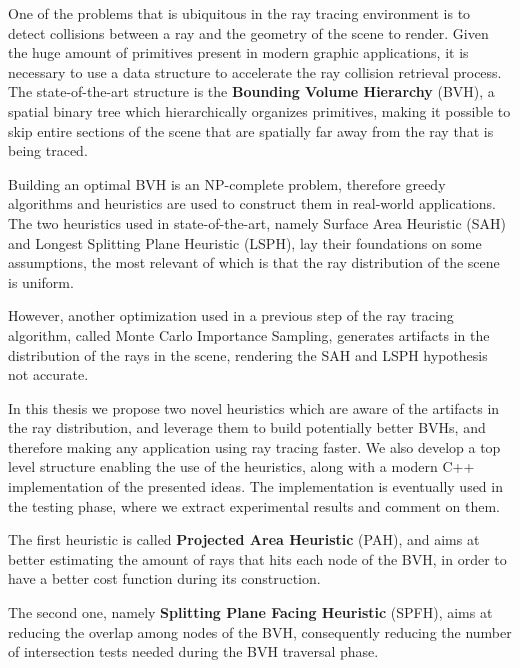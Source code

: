 \documentclass{PoliMi_MasterThesis}
\begin{document}
One of the problems that is ubiquitous in the ray tracing environment is to detect collisions between a ray and the geometry of the scene to render. Given the huge amount of primitives present in modern graphic applications, it is necessary to use a data structure to accelerate the ray collision retrieval process. The state-of-the-art structure is the \textbf{Bounding Volume Hierarchy} (BVH), a spatial binary tree which hierarchically organizes primitives, making it possible to skip entire sections of the scene that are spatially far away from the ray that is being traced. 

Building an optimal BVH is an NP-complete problem, therefore greedy algorithms and heuristics are used to construct them in real-world applications. The two heuristics used in state-of-the-art, namely Surface Area Heuristic (SAH) and Longest Splitting Plane Heuristic (LSPH), lay their foundations on some assumptions, the most relevant of which is that the ray distribution of the scene is uniform.

However, another optimization used in a previous step of the ray tracing algorithm, called Monte Carlo Importance Sampling, generates artifacts in the distribution of the rays in the scene, rendering the SAH and LSPH hypothesis not accurate.

In this thesis we propose two novel heuristics which are aware of the artifacts in the ray distribution, and leverage them to build potentially better BVHs, and therefore making any application using ray tracing faster. We also develop a top level structure enabling the use of the heuristics, along with a modern C++ implementation of the presented ideas. The implementation is eventually used in the testing phase, where we extract experimental results and comment on them.

The first heuristic is called \textbf{Projected Area Heuristic} (PAH), and aims at better estimating the amount of rays that hits each node of the BVH, in order to have a better cost function during its construction.

The second one, namely \textbf{Splitting Plane Facing Heuristic} (SPFH), aims at reducing the overlap among nodes of the BVH, consequently reducing the number of intersection tests needed during the BVH traversal phase.
\end{document}
